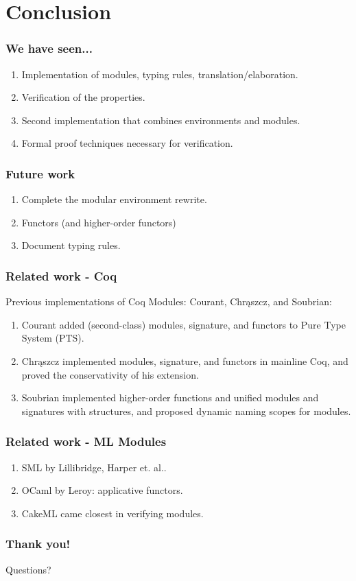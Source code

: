 \section{Conclusion}

\begin{frame}
  \frametitle{We have seen...}
  \begin{enumerate}
    \item Implementation of modules, typing rules, translation/elaboration.\pause
    \item Verification of the properties.\pause
    \item Second implementation that combines environments and modules.\pause
    \item Formal proof techniques necessary for verification.\pause
  \end{enumerate}
\end{frame}

\begin{frame}
  \frametitle{Future work}
  \begin{enumerate}
    \item Complete the modular environment rewrite.
    \item Functors (and higher-order functors)
    \item Document typing rules.
  \end{enumerate}
\end{frame}

\begin{frame}
  \frametitle{Related work - Coq}
  Previous implementations of Coq Modules: Courant, Chrąszcz, and
  Soubrian:
  \begin{enumerate}
    \item Courant added (second-class) modules, signature, and functors to Pure
    Type System (PTS).
    \item Chrąszcz implemented modules, signature, and functors in
    mainline Coq, and proved the conservativity of his extension.
    \item Soubrian implemented higher-order functions and unified modules and
    signatures with structures, and proposed dynamic naming scopes for modules.
  \end{enumerate}
\end{frame}

\begin{frame}
  \frametitle{Related work - ML Modules}
  
  \begin{enumerate}
    \item SML by Lillibridge, Harper et. al..
    \item OCaml by Leroy: applicative functors.
    \item CakeML came closest in verifying modules.
  \end{enumerate}
\end{frame}

\begin{frame}
  \frametitle{Thank you!}
  Questions?
\end{frame}